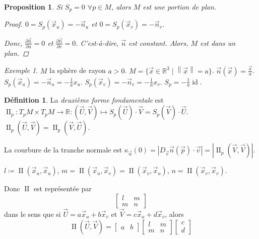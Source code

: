 \documentclass{report}
\newtheorem*{prop}{Proposition}
\theoremstyle{definition}
\newtheorem*{dfn}{D\'efinition}
\theoremstyle{remark}
\newtheorem*{exem}{Exemple}
\def\RR{\mathbb{R}}
\def\dff{\operatorname{II}}
\newcommand*{\abs}[1]{\left|#1\right|}
\newcommand*{\norme}[1]{\left\|#1\right\|}
\begin{document}
	\begin{prop}
		Si $S_p=0$ $\forall p\in M$, alors $M$ est une portion de plan.
		\begin{proof}
			$0=S_p(\vec x_u)=-\vec n_u$ et $0=S_p(\vec x_v)=-\vec n_v$.

			Donc, $\frac{\partial\vec n}{\partial u}=0$ et $\frac{\partial\vec n}{\partial v}=0$. C'est-\`a-dire, $\vec n$ est constant. Alors, $M$ est dans un plan.
		\end{proof}
	\end{prop}

	\begin{exem}
		$M$ la sph\`ere de rayon $a>0$. $M=\{\vec x\in\RR^3 \mid \norme{\vec x}=a\}$. $\vec n(\vec x)=\frac{\vec x}{a}$. $S_p(\vec x_u)=-\vec n_u=-\frac{1}{a}x_u$. $S_p(\vec x_v)=-\vec n_v=-\frac{1}{a}x_v$. $S_p=-\frac{1}{a}\operatorname{id}$.
	\end{exem}

	\begin{dfn}
		La \emph{deuxi\`eme forme fondamentale} est $\dff_p : T_pM\times T_pM\to\RR : (\vec U,\vec V)\mapsto S_p(\vec U)\cdot\vec V = S_p(\vec V)\cdot\vec U$. $\dff_p(\vec U,\vec V)=\dff_p(\vec V,\vec U)$.

		La courbure de la tranche normale est $\kappa_{\vec\alpha}(0) = \abs{D_{\vec v}\vec n(\vec p) \cdot \vec v} = \abs{\dff_p(\vec V,\vec V)}$.

		$l \coloneq \dff(\vec x_u,\vec x_u)$, $m=\dff(\vec x_u,\vec x_v)=\dff(\vec x_v,\vec x_u)$, $n=\dff(\vec x_v,\vec x_v)$.

		Donc $\dff$ est repr\'esent\'ee par \[ \begin{bmatrix}
			l&m\\m&n
		\end{bmatrix} \] dans le sens que si $\vec U=a\vec x_u+b\vec x_v$ et $\vec V=c\vec x_u+d\vec x_v$, alors \[ \dff(\vec U,\vec V)=\begin{bmatrix}
			a&b
		\end{bmatrix} \begin{bmatrix}
			l&m\\m&n
		\end{bmatrix} \begin{bmatrix}
			c\\d
		\end{bmatrix} \]
	\end{dfn}
\end{document}
